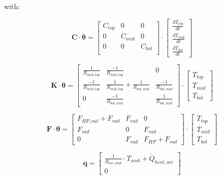 with:

\begin{equation}
	\mathbf{C} \cdot \boldsymbol{\dot{\theta}} =
	\begin{bmatrix}
		C_{top} & 0 & 0 \\
		0 &  C_{mid} & 0 \\
		0 & 0 & C_{bot} \\
	\end{bmatrix}
	\cdot
	\begin{bmatrix}
		\frac{dT_{top}}{dt} \\
		\frac{dT_{mid}}{dt} \\
		\frac{dT_{bot}}{dt}
	\end{bmatrix}
\end{equation}

\begin{equation}
	\mathbf{K} \cdot \boldsymbol{\theta} =
	\begin{bmatrix}
		\frac{1}{R_{mid,top}} & \frac{-1}{R_{mid,top}} & 0\\
		\frac{-1}{R_{mid,top}} &  \frac{1}{R_{mid, top}} + \frac{1}{R_{bot,mid}} & \frac{-1}{R_{bot,mid}}\\
		0 &  \frac{-1}{R_{bot, mid}} & \frac{1}{R_{bot,mid}}
	\end{bmatrix}
	\cdot
	\begin{bmatrix}
		T_{top} \\
		T_{mid} \\
		T_{bot}
	\end{bmatrix}
\end{equation}

\begin{equation}
	\mathbf{F} \cdot \boldsymbol{\theta} =
	\begin{bmatrix}
		F_{HP,out} + F_{rad} & F_{rad} & 0 \\
		F_{rad} &  0  & F_{rad} \\
		0 &  F_{rad} & F_{HP} + F_{rad}
	\end{bmatrix}
	\cdot
	\begin{bmatrix}
		T_{top} \\
		T_{mid} \\
		T_{bot}
	\end{bmatrix}
\end{equation}

\begin{equation}
	\mathbf{\dot{q}} =
	\begin{bmatrix}
		\frac{1}{R_{air, amb}} \cdot T_{amb} + \dot{Q}_{heat, air} \\
		0
	\end{bmatrix}
\end{equation}



